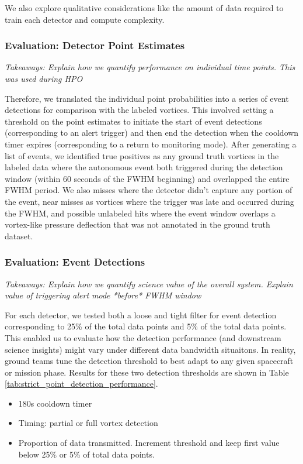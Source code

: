 We also explore qualitative considerations like the amount of data required to train each detector and compute complexity.

\subsubsection{Evaluation: Detector Point Estimates}
\label{subsubsec:methods:point_evaluation}
\textit{Takeaways: Explain how we quantify performance on individual time points. This was used during HPO}

Therefore, we translated the individual point probabilities into a series of event detections for comparison with the labeled vortices. 
This involved setting a threshold on the point estimates to initiate the start of event detections (corresponding to an alert trigger) and then end the detection when the cooldown timer expires (corresponding to a return to monitoring mode). 
After generating a list of events, we identified true positives as any ground truth vortices in the labeled data where the autonomous event both triggered during the detection window (within 60 seconds of the \acrshort{FWHM} beginning) and overlapped the entire \acrshort{FWHM} period. 
We also misses where the detector didn't capture any portion of the event, near misses as vortices where the trigger was late and occurred during the \acrshort{FWHM}, and possible unlabeled hits where the event window overlaps a  vortex-like pressure deflection that was not annotated in the ground truth dataset.


\subsubsection{Evaluation: Event Detections}
\label{subsec:evaluation_event_detections_methods}
\textit{Takeaways: Explain how we quantify science value of the overall system. Explain value of triggering alert mode *before* FWHM window}

For each detector, we tested both a loose and tight filter for event detection corresponding to 25\% of the total data points and 5\% of the total data points. 
This enabled us to evaluate how the detection performance (and downstream science insights) might vary under different data bandwidth situaitons. 
In reality, ground teams tune the detection threshold to best adapt to any given spacecraft or mission phase.
Results for these two detection thresholds are shown in Table \ref{tab:strict_point_detection_performance}.

\begin{itemize}
    \item 180s cooldown timer
    \item Timing: partial or full vortex detection
    \item Proportion of data transmitted. Increment threshold and keep first value below 25\% or 5\% of total data points.
\end{itemize}